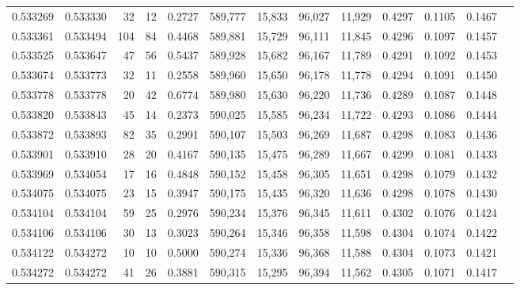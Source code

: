 \begin{tabular}{rrrrrrrrrrrrr}
0.533269 & 0.533330 &    32 &    12 &                                     0.2727 & 589,777 &  15,833 &  96,027 &  11,929 & 0.4297 & 0.1105 & 0.1467 \\
0.533361 & 0.533494 &   104 &    84 &                                     0.4468 & 589,881 &  15,729 &  96,111 &  11,845 & 0.4296 & 0.1097 & 0.1457 \\
0.533525 & 0.533647 &    47 &    56 &                                     0.5437 & 589,928 &  15,682 &  96,167 &  11,789 & 0.4291 & 0.1092 & 0.1453 \\
0.533674 & 0.533773 &    32 &    11 &                                     0.2558 & 589,960 &  15,650 &  96,178 &  11,778 & 0.4294 & 0.1091 & 0.1450 \\
0.533778 & 0.533778 &    20 &    42 &                                     0.6774 & 589,980 &  15,630 &  96,220 &  11,736 & 0.4289 & 0.1087 & 0.1448 \\
0.533820 & 0.533843 &    45 &    14 &                                     0.2373 & 590,025 &  15,585 &  96,234 &  11,722 & 0.4293 & 0.1086 & 0.1444 \\
0.533872 & 0.533893 &    82 &    35 &                                     0.2991 & 590,107 &  15,503 &  96,269 &  11,687 & 0.4298 & 0.1083 & 0.1436 \\
0.533901 & 0.533910 &    28 &    20 &                                     0.4167 & 590,135 &  15,475 &  96,289 &  11,667 & 0.4299 & 0.1081 & 0.1433 \\
0.533969 & 0.534054 &    17 &    16 &                                     0.4848 & 590,152 &  15,458 &  96,305 &  11,651 & 0.4298 & 0.1079 & 0.1432 \\
0.534075 & 0.534075 &    23 &    15 &                                     0.3947 & 590,175 &  15,435 &  96,320 &  11,636 & 0.4298 & 0.1078 & 0.1430 \\
0.534104 & 0.534104 &    59 &    25 &                                     0.2976 & 590,234 &  15,376 &  96,345 &  11,611 & 0.4302 & 0.1076 & 0.1424 \\
0.534106 & 0.534106 &    30 &    13 &                                     0.3023 & 590,264 &  15,346 &  96,358 &  11,598 & 0.4304 & 0.1074 & 0.1422 \\
0.534122 & 0.534272 &    10 &    10 &                                     0.5000 & 590,274 &  15,336 &  96,368 &  11,588 & 0.4304 & 0.1073 & 0.1421 \\
0.534272 & 0.534272 &    41 &    26 &                                     0.3881 & 590,315 &  15,295 &  96,394 &  11,562 & 0.4305 & 0.1071 & 0.1417 \\

\end{tabular}
